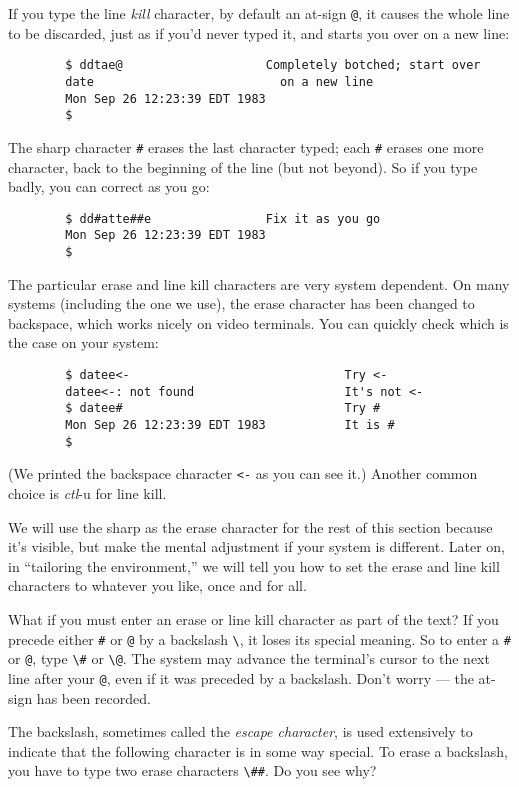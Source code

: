 If you type the line \textit{kill} character, by default an at-sign \verb=@=, it
causes the whole line to be discarded, just as if you'd never typed it, and
starts you over on a new line:
\begin{verbatim}
        $ ddtae@                    Completely botched; start over
        date                          on a new line
        Mon Sep 26 12:23:39 EDT 1983
        $
\end{verbatim}
The sharp character \verb=#= erases the last character typed; each \verb=#=
erases one more character, back to the beginning of the line (but not
beyond). So if you type badly, you can correct as you go:
\begin{verbatim}
        $ dd#atte##e                Fix it as you go
        Mon Sep 26 12:23:39 EDT 1983
        $
\end{verbatim}
The particular erase and line kill characters are very system dependent. On many
systems (including the one we use), the erase character has been changed to
backspace, which works nicely on video terminals. You can quickly check which is
the case on your system:
\begin{verbatim}
        $ datee<-                              Try <-
        datee<-: not found                     It's not <-
        $ datee#                               Try #
        Mon Sep 26 12:23:39 EDT 1983           It is #
        $
\end{verbatim}
(We printed the backspace character \verb=<-= as you can see it.) Another common
choice is \textit{ctl}-u for line kill.

We will use the sharp as the erase character for the rest of this section
because it's visible, but make the mental adjustment if your system is
different. Later on, in ``tailoring the environment,'' we will tell you how to
set the erase and line kill characters to whatever you like, once and for all.

What if you must enter an erase or line kill character as part of the text? If
you precede either \verb=#= or \verb=@= by a backslash \verb=\=, it loses its
special meaning. So to enter a \verb=#= or \verb=@=, type \verb=\#= or
\verb=\@=. The system may advance the terminal's cursor to the next line after
your \verb=@=, even if it was preceded by a backslash. Don't worry --- the
at-sign has been recorded.

The backslash, sometimes called the \textit{escape character}, is used
extensively to indicate that the following character is in some way special. To
erase a backslash, you have to type two erase characters \verb=\##=. Do you see
why?

